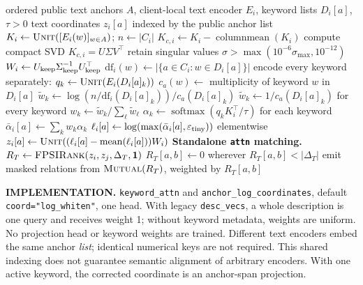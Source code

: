 \documentclass[11pt]{article}
\newcommand{\mutual}{\textsc{Mutual}}
\newcommand{\unit}{\textsc{Unit}}
\newcommand{\fprank}{\textsc{FPSIRank}}
\begin{document}
\begin{algorithm}[p]
\caption{Keyword attention coordinates used by the implementation}
\label{alg:a3b}
\footnotesize\begin{algorithmic}[1]
\Require ordered public text anchors $A$, client-local text encoder $E_i$, keyword lists $D_i[a]$, $\tau>0$
\Ensure text coordinates $z_i[a]$ indexed by the public anchor list
 \State $K_i\gets\unit([E_i(w)]_{w\in A})$; $n\gets|C_i|$
 \State $K_{c,i}\gets K_i-\operatorname{columnmean}(K_i)$
 \State compute compact SVD $K_{c,i}=U\Sigma V^\top$
 \State retain singular values $\sigma>\max(10^{-6}\sigma_{\max},10^{-12})$
 \State $W_i\gets U_{\rm keep}\Sigma_{\rm keep}^{-1}U_{\rm keep}^\top$
 \State $\mathrm{df}_i(w)\gets|\{a\in C_i:w\in D_i[a]\}|$
  \State encode every keyword separately: $q_k\gets\unit(E_i(D_i[a]_k))$
  \State $c_a(w)\gets$ multiplicity of keyword $w$ in $D_i[a]$
  \State $\widetilde w_k\gets\log(n/\mathrm{df}_i(D_i[a]_k))/c_a(D_i[a]_k)$
   \State $\widetilde w_k\gets1/c_a(D_i[a]_k)$ for every keyword
  \EndIf
  \State $w_k\gets\widetilde w_k/\sum_\ell\widetilde w_\ell$
  \State $\alpha_k\gets\operatorname{softmax}(q_kK_i^\top/\tau)$ for each keyword
  \State $\bar\alpha_i[a]\gets\sum_k w_k\alpha_k$
  \State $\ell_i[a]\gets\log(\max(\bar\alpha_i[a],\varepsilon_{\rm tiny}))$ elementwise
  \State $z_i[a]\gets\unit((\ell_i[a]-\operatorname{mean}(\ell_i[a]))W_i)$
 \EndFor
\EndFor
\Statex \textbf{Standalone \texttt{attn} matching.}
 \State $R_T\gets\fprank(z_i,z_j,\Delta_T,\mathbf{1})$
 \State $R_T[a,b]\gets0$ wherever $R_T[a,b]<|\Delta_T|$
 \State emit masked relations from $\mutual(R_T)$, weighted by $R_T[a,b]$
\EndFor
\Statex \hrulefill
\Statex \raggedright\textbf{IMPLEMENTATION.} \texttt{keyword\_attn} and
\texttt{anchor\_log\_coordinates}, default \texttt{coord="log\_whiten"}, one head.
With legacy \texttt{desc\_vecs}, a whole description is one query and receives
weight 1; without keyword metadata, weights are uniform. No projection head or
keyword weights are trained. Different text encoders embed the same anchor
\emph{list}; identical numerical keys are not required. This shared indexing
does not guarantee semantic alignment of arbitrary encoders. With one active
keyword, the corrected coordinate is an anchor-span projection.
\end{algorithmic}\end{algorithm}
\end{document}

